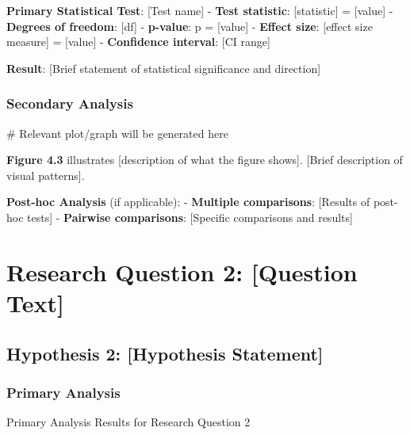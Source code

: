 \documentclass[
  12pt,
  letterpaper,
  12pt,
  letterpaper,
  oneside]{report}
\newenvironment{Shaded}{\begin{snugshade}}{\end{snugshade}}
\newcommand{\CommentTok}[1]{\textcolor[rgb]{0.37,0.37,0.37}{#1}}
\begin{document}
\textbf{Primary Statistical Test}: {[}Test name{]} - \textbf{Test
statistic}: {[}statistic{]} = {[}value{]} - \textbf{Degrees of freedom}:
{[}df{]} - \textbf{p-value}: p = {[}value{]} - \textbf{Effect size}:
{[}effect size measure{]} = {[}value{]} - \textbf{Confidence interval}:
{[}CI range{]}

\textbf{Result}: {[}Brief statement of statistical significance and
direction{]}

\subsubsection{Secondary Analysis}\label{secondary-analysis}

\begin{Shaded}
\begin{Highlighting}[]
\CommentTok{\# Relevant plot/graph will be generated here}
\end{Highlighting}
\end{Shaded}

\textbf{Figure 4.3} illustrates {[}description of what the figure
shows{]}. {[}Brief description of visual patterns{]}.

\textbf{Post-hoc Analysis} (if applicable): - \textbf{Multiple
comparisons}: {[}Results of post-hoc tests{]} - \textbf{Pairwise
comparisons}: {[}Specific comparisons and results{]}

\section{Research Question 2: {[}Question
Text{]}}\label{research-question-2-question-text}

\subsection{Hypothesis 2: {[}Hypothesis
Statement{]}}\label{hypothesis-2-hypothesis-statement}

\subsubsection{Primary Analysis}\label{primary-analysis-1}

\begin{table}

\caption{\label{tbl-rq2-primary}Primary Analysis Results for Research
Question 2}

\centering{

\begin{Shaded}
\begin{Highlighting}[]
\CommentTok{\# Analysis results table will be generated here}
\end{Highlighting}
\end{Shaded}

}

\end{table}%
\end{document}
